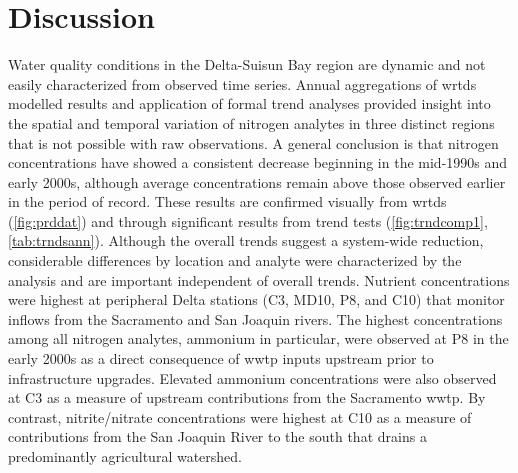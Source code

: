 \documentclass[letterpaper,12pt,oneside]{article}\usepackage[]{graphicx}\usepackage[]{color}
\begin{document}
\section{Discussion}

Water quality conditions in the Delta-Suisun Bay region are dynamic and not easily characterized from observed time series.  Annual aggregations of \ac{wrtds} modelled results and application of formal trend analyses provided insight into the spatial and temporal variation of nitrogen analytes in three distinct regions that is not possible with raw observations.  A general conclusion is that nitrogen concentrations have showed a consistent decrease beginning in the mid-1990s and early 2000s, although average concentrations remain above those observed earlier in the period of record.  These results are confirmed visually from \ac{wrtds} (\cref{fig:prddat}) and through significant results from trend tests (\cref{fig:trndcomp1}, \cref{tab:trndsann}).  Although the overall trends suggest a system-wide reduction, considerable differences by location and analyte were characterized by the analysis and are important independent of overall trends.  Nutrient concentrations were highest at peripheral Delta stations (C3, MD10, P8, and C10) that monitor inflows from the Sacramento and San Joaquin rivers.  The highest concentrations among all nitrogen analytes, ammonium in particular, were observed at P8 in the early 2000s as a direct consequence of \ac{wwtp} inputs upstream prior to infrastructure upgrades.  Elevated ammonium concentrations were also observed at C3 as a measure of upstream contributions from the Sacramento \ac{wwtp}.  By contrast, nitrite/nitrate concentrations were highest at C10 as a measure of contributions from the San Joaquin River to the south that drains a predominantly agricultural watershed.
\end{document}
